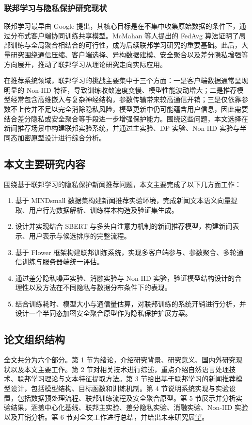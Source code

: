 \documentclass[UTF8,a4paper,12pt]{ctexart}
\numberwithin{equation}{section}
\begin{document}
\subsubsection{联邦学习与隐私保护研究现状}
联邦学习最早由 Google 提出，其核心目标是在不集中收集原始数据的条件下，通过分布式客户端协同训练共享模型。McMahan 等人提出的 FedAvg 算法证明了局部训练与全局聚合相结合的可行性，成为后续联邦学习研究的重要基础。此后，大量研究围绕通信压缩、客户端选择、异构数据建模、安全聚合以及差分隐私增强等方向展开，推动了联邦学习从理论研究走向实际应用。

在推荐系统领域，联邦学习的挑战主要集中于三个方面：一是客户端数据通常呈现明显的 Non-IID 特征，导致训练收敛速度变慢、模型性能波动增大；二是推荐模型经常包含高维嵌入与复杂神经结构，参数传输带来较高通信开销；三是仅依靠参数不上传并不足以完全消除隐私风险，模型更新中仍可能蕴含用户信息，因此需要结合差分隐私或安全聚合等手段进一步增强保护能力。围绕这些问题，本文选择在新闻推荐场景中构建联邦实验系统，并通过主实验、DP 实验、Non-IID 实验与半同态加密原型设计进行综合分析。

\subsection{本文主要研究内容}
围绕基于联邦学习的隐私保护新闻推荐问题，本文主要完成了以下几方面工作：

\begin{enumerate}
\item 基于 MINDsmall 数据集构建新闻推荐实验环境，完成新闻文本语义向量提取、用户行为数据解析、训练样本构造及验证集生成。
\item 设计并实现结合 SBERT 与多头自注意力机制的新闻推荐模型，构建新闻表示、用户表示与候选排序的完整流程。
\item 基于 Flower 框架构建联邦训练系统，实现多客户端参与、参数聚合、多轮通信训练与服务器端统一评估。
\item 通过差分隐私噪声实验、消融实验与 Non-IID 实验，验证模型结构设计的合理性以及方法在不同隐私与数据分布条件下的表现。
\item 结合训练耗时、模型大小与通信量估算，对联邦训练的系统开销进行分析，并设计一个半同态加密安全聚合原型作为隐私保护扩展方案。
\end{enumerate}

\subsection{论文组织结构}
全文共分为六个部分。第 1 节为绪论，介绍研究背景、研究意义、国内外研究现状以及本文主要工作。第 2 节对相关技术进行综述，重点介绍自然语言处理技术、联邦学习理论与文本特征提取方法。第 3 节给出基于联邦学习的新闻推荐模型设计，包括模型结构、目标函数和训练机制。第 4 节说明系统实现与实验设置，包括数据预处理流程、联邦训练流程及安全聚合原型。第 5 节展示并分析实验结果，涵盖中心化基线、联邦主实验、差分隐私实验、消融实验、Non-IID 实验以及开销分析。第 6 节对全文工作进行总结，并给出未来研究展望。
\end{document}
